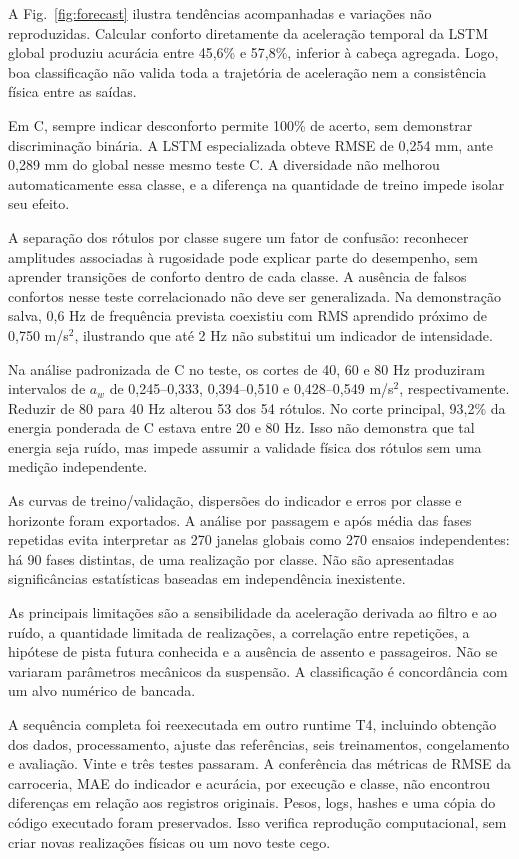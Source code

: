 \documentclass[conference]{IEEEtran}
\begin{document}
A Fig.~\ref{fig:forecast} ilustra tendências acompanhadas e variações não reproduzidas. Calcular conforto diretamente da aceleração temporal da LSTM global produziu acurácia entre 45,6\% e 57,8\%, inferior à cabeça agregada. Logo, boa classificação não valida toda a trajetória de aceleração nem a consistência física entre as saídas.

Em C, sempre indicar desconforto permite 100\% de acerto, sem demonstrar discriminação binária. A LSTM especializada obteve RMSE de 0,254 mm, ante 0,289 mm do global nesse mesmo teste C. A diversidade não melhorou automaticamente essa classe, e a diferença na quantidade de treino impede isolar seu efeito.

A separação dos rótulos por classe sugere um fator de confusão: reconhecer amplitudes associadas à rugosidade pode explicar parte do desempenho, sem aprender transições de conforto dentro de cada classe. A ausência de falsos confortos nesse teste correlacionado não deve ser generalizada. Na demonstração salva, 0,6 Hz de frequência prevista coexistiu com RMS aprendido próximo de 0,750 m/s$^2$, ilustrando que até 2 Hz não substitui um indicador de intensidade.

Na análise padronizada de C no teste, os cortes de 40, 60 e 80 Hz produziram intervalos de $a_w$ de 0,245--0,333, 0,394--0,510 e 0,428--0,549 m/s$^2$, respectivamente. Reduzir de 80 para 40 Hz alterou 53 dos 54 rótulos. No corte principal, 93,2\% da energia ponderada de C estava entre 20 e 80 Hz. Isso não demonstra que tal energia seja ruído, mas impede assumir a validade física dos rótulos sem uma medição independente.

As curvas de treino/validação, dispersões do indicador e erros por classe e horizonte foram exportados. A análise por passagem e após média das fases repetidas evita interpretar as 270 janelas globais como 270 ensaios independentes: há 90 fases distintas, de uma realização por classe. Não são apresentadas significâncias estatísticas baseadas em independência inexistente.

As principais limitações são a sensibilidade da aceleração derivada ao filtro e ao ruído, a quantidade limitada de realizações, a correlação entre repetições, a hipótese de pista futura conhecida e a ausência de assento e passageiros. Não se variaram parâmetros mecânicos da suspensão. A classificação é concordância com um alvo numérico de bancada.

A sequência completa foi reexecutada em outro runtime T4, incluindo obtenção dos dados, processamento, ajuste das referências, seis treinamentos, congelamento e avaliação. Vinte e três testes passaram. A conferência das métricas de RMSE da carroceria, MAE do indicador e acurácia, por execução e classe, não encontrou diferenças em relação aos registros originais. Pesos, logs, hashes e uma cópia do código executado foram preservados. Isso verifica reprodução computacional, sem criar novas realizações físicas ou um novo teste cego.
\end{document}
